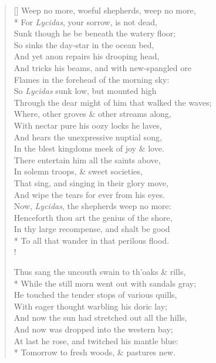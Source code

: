 \documentclass[MAIN]{subfiles}
\begin{document}
\begin{verse}[\versewidth]
Weep no more, woeful shepherds, weep no more,\\*
For \emph{Lycidas}, your sorrow, is not dead,\\
Sunk though he be beneath the watery floor;\\
So sinks the day-star in the ocean bed,\\
And yet anon repairs his drooping head,\\
And tricks his beams, and with new-spangled ore\\
Flames in the forehead of the morning sky:\\
So \emph{Lycidas} sunk low, but mounted high\\
Through the dear might of him that walked the waves;\\
Where, other groves \& other streams along,\\
With nectar pure his oozy locks he laves,\\
And hears the unexpressive nuptial song,\\
In the blest kingdoms meek of joy \& love.\\
There entertain him all the saints above,\\
In solemn troops, \& sweet societies,\\
That sing, and singing in their glory move,\\
And wipe the tears for ever from his eyes.\\
Now, \emph{Lycidas}, the shepherds weep no more:\\
Henceforth thou art the genius of the shore,\\
In thy large recompense, and shalt be good\\*
To all that wander in that perilous flood.\\!

Thus sang the uncouth swain to th'oaks \& rills,\\*
While the still morn went out with sandals gray;\\
He touched the tender stops of various quills,\\
With eager thought warbling his doric lay;\\
And now the sun had stretched out all the hills,\\
And now was dropped into the western bay;\\
At last he rose, and twitched his mantle blue:\\*
Tomorrow to fresh woods, \& pastures new.
\end{verse}
\end{document}
